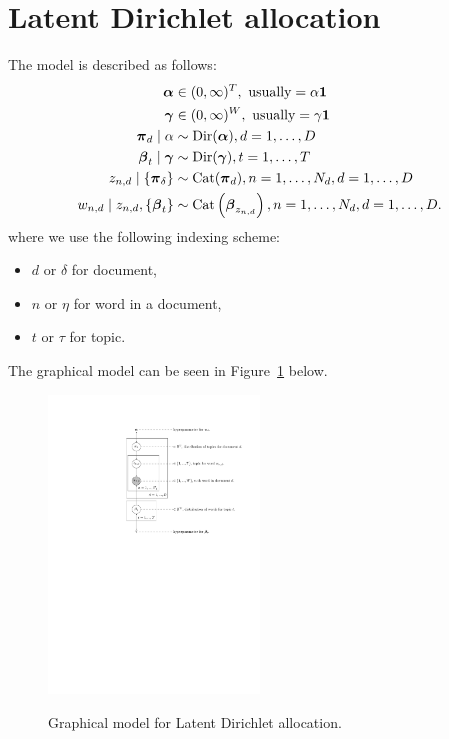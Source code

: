 \section{Latent Dirichlet allocation}
The model is described as follows:
\begin{align}
    \boldsymbol{\mathbf{\alpha}}                                 &\in (0, \infty)^T, \text{ usually} = \alpha\boldsymbol{\mathbf{1}} \\
    \boldsymbol{\mathbf{\gamma}}                                 &\in (0, \infty)^W, \text{ usually} = \gamma\boldsymbol{\mathbf{1}} \\
    \boldsymbol{\mathbf{\pi}}_d \mid \alpha                    &\sim \operatorname{Dir}(\boldsymbol{\mathbf{\alpha}}), d = 1, \dotsc, D \\
    \boldsymbol{\mathbf{\beta}}_t \mid \boldsymbol{\mathbf{\gamma}}             &\sim \operatorname{Dir}(\boldsymbol{\mathbf{\gamma}}), t = 1, \dotsc, T \\
    z_{n, d} \mid \{\boldsymbol{\mathbf{\pi}}_{\delta}\}        &\sim \operatorname{Cat}(\boldsymbol{\mathbf{\pi}}_d), n = 1, \dotsc, N_d, d = 1, \dotsc, D \\
    w_{n, d} \mid z_{n, d}, \{\boldsymbol{\mathbf{\beta}}_t\}  &\sim \operatorname{Cat}\left(\boldsymbol{\mathbf{\beta}}_{z_{n, d}}\right), n = 1, \dotsc, N_d, d = 1, \dotsc, D.
\end{align}
where we use the following indexing scheme:
\begin{itemize}
    \item $d$ or $\delta$ for document,
    \item $n$ or $\eta$ for word in a document,
    \item $t$ or $\tau$ for topic.
\end{itemize}
The graphical model can be seen in Figure~\ref{fig:models/lda/figures/lda} below.
\begin{figure}[htb!]
    \centering
        \includegraphics[width=0.5\textwidth]{models/lda/figures/lda}
    \label{fig:models/lda/figures/lda}
    \caption{Graphical model for Latent Dirichlet allocation.}
\end{figure}

